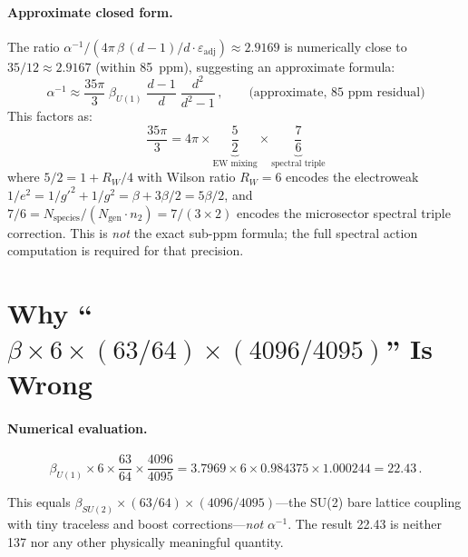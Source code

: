 \documentclass[12pt,a4paper]{article}
\begin{document}
\paragraph{Approximate closed form.}
The ratio $\alpha^{-1}/(4\pi\,\beta\,(d{-}1)/d\cdot\varepsilon_{\mathrm{adj}})
\approx 2.9169$ is numerically close to $35/12 \approx 2.9167$
(within 85~ppm), suggesting an approximate formula:
\begin{equation}
\alpha^{-1} \approx \frac{35\pi}{3}\;\beta_{U(1)}\;\frac{d-1}{d}
\;\frac{d^2}{d^2-1}\,,
\qquad\text{(approximate, 85~ppm residual)}
\end{equation}
This factors as:
\begin{equation}
\frac{35\pi}{3} = 4\pi \times \underbrace{\frac{5}{2}}_{\text{EW mixing}} \times \underbrace{\frac{7}{6}}_{\text{spectral triple}}
\end{equation}
where $5/2 = 1 + R_W/4$ with Wilson ratio $R_W=6$ encodes the electroweak
$1/e^2 = 1/g'^2 + 1/g^2 = \beta + 3\beta/2 = 5\beta/2$, and
$7/6 = N_{\mathrm{species}}/(N_{\mathrm{gen}} \cdot n_2) = 7/(3 \times 2)$
encodes the microsector spectral triple correction.
This is \emph{not} the exact sub-ppm formula; the full spectral action
computation is required for that precision.

\section{Why ``$\beta \times 6 \times (63/64) \times (4096/4095)$'' Is Wrong}
\label{sec:wrong}

\paragraph{Numerical evaluation.}
\begin{equation}
\beta_{U(1)} \times 6 \times \frac{63}{64} \times \frac{4096}{4095}
= 3.7969 \times 6 \times 0.984375 \times 1.000244
= 22.43\,.
\end{equation}

This equals $\beta_{SU(2)} \times (63/64) \times (4096/4095)$---the
SU(2) bare lattice coupling with tiny traceless and boost corrections---\emph{not}
$\alpha^{-1}$.  The result 22.43 is neither 137 nor any other physically
meaningful quantity.
\end{document}
